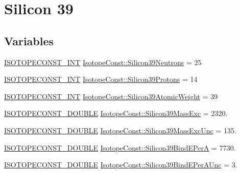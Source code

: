 \hypertarget{group___isotope_const-_silicon-_si39}{}\section{Silicon 39}
\label{group___isotope_const-_silicon-_si39}
\subsection*{Variables}
\begin{DoxyCompactItemize}
\item 
\mbox{\hyperlink{group___isotope_const-_macros_ga5f18360b3e99483a35c32d789e62621c}{I\+S\+O\+T\+O\+P\+E\+C\+O\+N\+S\+T\+\_\+\+I\+NT}} \mbox{\hyperlink{group___isotope_const-_silicon-_si39_gad332cbdb98b51e9ce72272c3daa4760b}{Isotope\+Const\+::\+Silicon39\+Neutrons}} = 25
\item 
\mbox{\hyperlink{group___isotope_const-_macros_ga5f18360b3e99483a35c32d789e62621c}{I\+S\+O\+T\+O\+P\+E\+C\+O\+N\+S\+T\+\_\+\+I\+NT}} \mbox{\hyperlink{group___isotope_const-_silicon-_si39_gaf9d26fbed9783c156fe3498c7aae719a}{Isotope\+Const\+::\+Silicon39\+Protons}} = 14
\item 
\mbox{\hyperlink{group___isotope_const-_macros_ga5f18360b3e99483a35c32d789e62621c}{I\+S\+O\+T\+O\+P\+E\+C\+O\+N\+S\+T\+\_\+\+I\+NT}} \mbox{\hyperlink{group___isotope_const-_silicon-_si39_gaa56a64c6c062e3e3ce66eb0869f595f8}{Isotope\+Const\+::\+Silicon39\+Atomic\+Weight}} = 39
\item 
\mbox{\hyperlink{group___isotope_const-_macros_ga8f45a7272ce02c0b4c65c44636ed719a}{I\+S\+O\+T\+O\+P\+E\+C\+O\+N\+S\+T\+\_\+\+D\+O\+U\+B\+LE}} \mbox{\hyperlink{group___isotope_const-_silicon-_si39_ga870435698c6b2d4f3957bf1df76cb33a}{Isotope\+Const\+::\+Silicon39\+Mass\+Exc}} = 2320.
\item 
\mbox{\hyperlink{group___isotope_const-_macros_ga8f45a7272ce02c0b4c65c44636ed719a}{I\+S\+O\+T\+O\+P\+E\+C\+O\+N\+S\+T\+\_\+\+D\+O\+U\+B\+LE}} \mbox{\hyperlink{group___isotope_const-_silicon-_si39_gaa8c67bc898a70ed23c4b12f6cff3d03f}{Isotope\+Const\+::\+Silicon39\+Mass\+Exc\+Unc}} = 135.
\item 
\mbox{\hyperlink{group___isotope_const-_macros_ga8f45a7272ce02c0b4c65c44636ed719a}{I\+S\+O\+T\+O\+P\+E\+C\+O\+N\+S\+T\+\_\+\+D\+O\+U\+B\+LE}} \mbox{\hyperlink{group___isotope_const-_silicon-_si39_ga0c67d67d6f7806c6a8e0a9b860831103}{Isotope\+Const\+::\+Silicon39\+Bind\+E\+PerA}} = 7730.
\item 
\mbox{\hyperlink{group___isotope_const-_macros_ga8f45a7272ce02c0b4c65c44636ed719a}{I\+S\+O\+T\+O\+P\+E\+C\+O\+N\+S\+T\+\_\+\+D\+O\+U\+B\+LE}} \mbox{\hyperlink{group___isotope_const-_silicon-_si39_gaadd7ccef814615f3647a091001496f1b}{Isotope\+Const\+::\+Silicon39\+Bind\+E\+Per\+A\+Unc}} = 3.

\end{DoxyCompactItemize}
